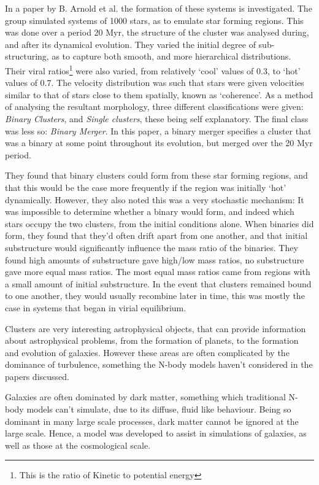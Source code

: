 \documentclass[a4paper,10pt]{article}
\begin{document}
In a paper by B. Arnold et al. the formation of these systems is investigated\cite{ClusterBinary}. The group simulated systems of 1000 stars, as to emulate star forming regions. This was done over a period 20 Myr, the structure of the cluster was analysed during, and after its dynamical evolution. They varied the initial degree of sub-structuring, as to capture both smooth, and more hierarchical distributions. Their viral ratios\footnote{This is the ratio of Kinetic to potential energy} were also varied, from relatively `cool' values of 0.3, to `hot' values of 0.7. The velocity distribution was such that stars were given velocities similar to that of stars close to them spatially, known as `coherence'. As a method of analysing the resultant morphology, three different classifications were given: \textit{Binary Clusters}, and \textit{Single clusters}, these being self explanatory. The final class was less so: \textit{Binary Merger}. In this paper, a binary merger specifies a cluster that was a binary at some point throughout its evolution, but merged over the 20 Myr period.

They found that binary clusters could form from these star forming regions, and that this would be the case more frequently if the region was initially `hot' dynamically. However, they also noted this was a very stochastic mechanism: It was impossible to determine whether a binary would form, and indeed which stars occupy the two clusters, from the initial conditions alone. When binaries did form, they found that they'd often drift apart from one another, and that initial substructure would significantly influence the mass ratio of the binaries. They found high amounts of substructure gave high/low mass ratios, no substructure gave more equal mass ratios. The most equal mass ratios came from regions with a small amount of initial substructure. In the event that clusters remained bound to one another, they would usually recombine later in time, this was mostly the case in systems that began in virial equilibrium.

Clusters are very interesting astrophysical objects, that can provide information about astrophysical problems, from the formation of planets, to the formation and evolution of galaxies. However these areas are often complicated by the dominance of turbulence, something the N-body models haven't considered in the papers discussed.

Galaxies are often dominated by dark matter, something which traditional N-body models can't simulate, due to its diffuse, fluid like behaviour. Being so dominant in many large scale processes, dark matter cannot be ignored at the large scale. Hence, a model was developed to assist in simulations of galaxies, as well as those at the cosmological scale. 
\end{document}
